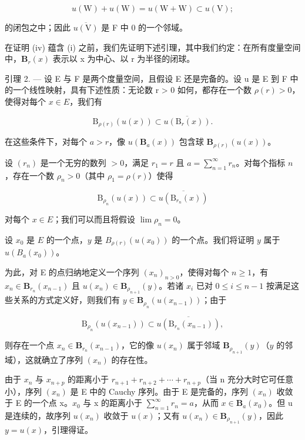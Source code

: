 \[
u (\mathrm{W}) + u (\mathrm{W}) = u (\mathrm{W} + \mathrm{W}) \subset u (\mathrm{V});
\]

的闭包之中；因此 \(\overline{u(\mathrm{V})}\) 是 F 中 0 的一个邻域。

在证明 (iv) 蕴含 (i) 之前，我们先证明下述引理，其中我们约定：在所有度量空间中，\(\mathbf{B}_{r}(x)\) 表示以 x 为中心、以 r 为半径的闭球。

引理 2. --- 设 E 与 F 是两个度量空间，且假设 E 还是完备的。设 u 是 E 到 F 中的一个线性映射，具有下述性质：无论数 r \textgreater{} 0 如何，都存在一个数 \(\rho(r) > 0\)，使得对每个 \(x \in E\)，我们有

\[
\mathrm{B} _ {\rho (r)} (u (x)) \subset \overline {{u (\mathrm{B} _ {r} (x))}}.
\]

在这些条件下，对每个 \(a > r\)，像 \(u(\mathbf{B}_a(x))\) 包含球 \(\mathbf{B}_{\rho(r)}(u(x))\)。

设 \((r_n)\) 是一个无穷的数列 \(>0\)，满足 \(r_1 = r\) 且 \(a = \sum_{n=1}^{\infty} r_n\)。对每个指标 \(n\)，存在一个数 \(\rho_n > 0\)（其中 \(\rho_1 = \rho(r)\)）使得

\[
\mathrm{B} _ {\rho_ {n}} (u (x)) \subset \overline {{u (\mathrm{B} _ {r _ {n}} (x))}}
\]

对每个 \(x \in E\)；我们可以而且将假设 \(\lim \rho_{n} = 0\)。

设 \(x_0\) 是 \(E\) 的一个点，\(y\) 是 \(B_{\rho(r)}(u(x_0))\) 的一个点。我们将证明 \(y\) 属于 \(u(B_a(x_0))\)。

为此，对 E 的点归纳地定义一个序列 \((x_{n})_{n>0}\)，使得对每个 \(n \geqslant 1\)，有 \(x_{n} \in \mathbf{B}_{r_{n}}(x_{n-1})\) 且 \(u(x_{n}) \in \mathbf{B}_{\rho_{n+1}}(y)\)。若诸 \(x_{i}\) 已对 \(0 \leqslant i \leqslant n - 1\) 按满足这些关系的方式定义好，则我们有 \(y \in \mathbf{B}_{\rho_{n}}(u(x_{n-1}))\)；由于

\[
\mathrm{B} _ {\rho_ {n}} (u (x _ {n - 1})) \subset \overline {{u (\mathrm{B} _ {r _ {n}} (x _ {n - 1}))}},
\]

则存在一个点 \(x_{n} \in \mathbf{B}_{r_n}(x_{n-1})\)，它的像 \(u(x_{n})\) 属于邻域 \(\mathbf{B}_{\rho_{n+1}}(y)\)（\(y\) 的邻域），这就确立了序列 \((x_{n})\) 的存在性。

由于 \(x_{n}\) 与 \(x_{n+p}\) 的距离小于 \(r_{n+1} + r_{n+2} + \cdots + r_{n+p}\)（当 n 充分大时它可任意小），序列 \((x_{n})\) 是 E 中的 Cauchy 序列。由于 E 是完备的，序列 \((x_{n})\) 收敛于 E 的一个点 x。\(x_{0}\) 与 x 的距离小于 \(\sum_{n=1}^{\infty} r_{n} = a\)，从而 \(x \in \mathbf{B}_{a}(x_{0})\)。但 u 是连续的，故序列 \(u(x_{n})\) 收敛于 \(u(x)\)；又有 \(u(x_{n}) \in \mathbf{B}_{\rho_{n+1}}(y)\)，因此 \(y = u(x)\)，引理得证。

